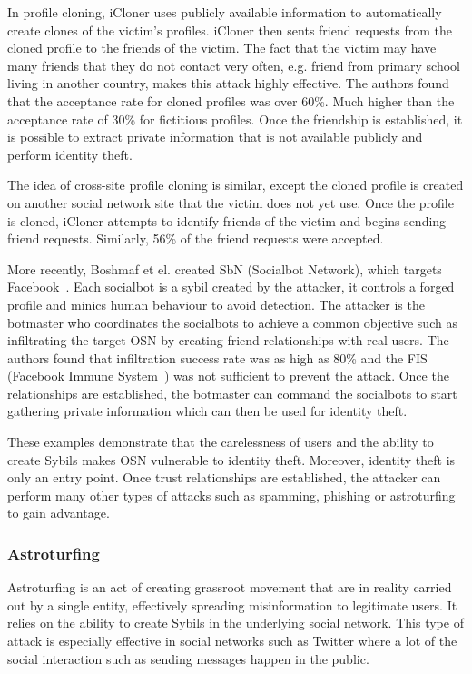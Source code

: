 In profile cloning, iCloner uses publicly available information to automatically
create clones of the victim's profiles. iCloner then sents friend requests from
the cloned profile to the friends of the victim. The fact that the victim may
have many friends that they do not contact very often, e.g. friend from primary
school living in another country, makes this attack highly effective. The
authors found that the acceptance rate for cloned profiles was over 60\%. Much
higher than the acceptance rate of 30\% for fictitious profiles. Once the
friendship is established, it is possible to extract private information that is
not available publicly and perform identity theft.

The idea of cross-site profile cloning is similar, except the cloned profile is
created on another social network site that the victim does not yet use. Once
the profile is cloned, iCloner attempts to identify friends of the
victim and begins sending friend requests. Similarly, 56\% of the friend
requests were accepted. 

More recently, Boshmaf et el. created SbN (Socialbot Network), which targets
Facebook~\cite{boshmaf2011socialbot}. Each socialbot is a sybil created by the
attacker, it controls a forged profile and minics human behaviour to avoid
detection. The attacker is the botmaster who coordinates the socialbots to
achieve a common objective such as infiltrating the target OSN by creating
friend relationships with real users. The authors found that infiltration
success rate was as high as 80\% and the FIS (Facebook Immune
System~\cite{stein2011facebook}) was not sufficient to prevent the attack. Once
the relationships are established, the botmaster can command the socialbots to
start gathering private information which can then be used for identity theft.


These examples demonstrate that the carelessness of users and the ability to
create Sybils makes OSN vulnerable to identity theft. Moreover, identity theft
is only an entry point. Once trust relationships are established, the attacker
can perform many other types of attacks such as spamming, phishing or
astroturfing to gain advantage.

\subsubsection{Astroturfing}
Astroturfing is an act of creating grassroot movement that are in reality
carried out by a single entity, effectively spreading misinformation to
legitimate users. It relies on the ability to create Sybils in the underlying
social network. This type of attack is especially effective in social networks
such as Twitter where a lot of the social interaction such as sending messages
happen in the public.

